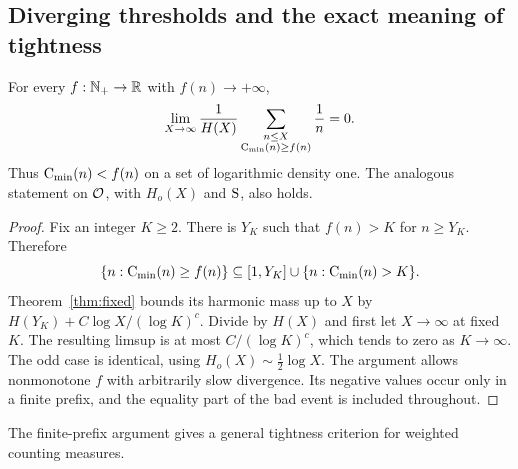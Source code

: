 \subsection{Diverging thresholds and the exact meaning of tightness}

\begin{corollary}\label{cor:tao}
For every $f:\mathbb N_+\to\mathbb R$ with $f(n)\to+\infty$,
\[
 \lim_{X\to\infty}\frac1{H(X)}
 \sum_{\substack{n\leq X\\\mathrm C_{\min}(n)\geq f(n)}}\frac1n=0.
\]
Thus $\mathrm C_{\min}(n)<f(n)$ on a set of logarithmic density one.
The analogous statement on $\mathcal O$, with $H_o(X)$ and $\mathrm S$, also holds.
\end{corollary}
\begin{proof}
Fix an integer $K\geq2$.  There is $Y_K$ such that $f(n)>K$ for
$n\geq Y_K$.  Therefore
\[
 \{n:\mathrm C_{\min}(n)\geq f(n)\}
 \subseteq[1,Y_K]\cup\{n:\mathrm C_{\min}(n)>K\}.
\]
Theorem~\ref{thm:fixed} bounds its harmonic mass up to $X$ by
$H(Y_K)+C\log X/(\log K)^c$.  Divide by $H(X)$ and first let
$X\to\infty$ at fixed $K$.  The resulting limsup is at most
$C/(\log K)^c$, which tends to zero as $K\to\infty$.
The odd case is identical, using $H_o(X)\sim\frac12\log X$.
The argument allows nonmonotone $f$ with arbitrarily slow divergence.
Its negative values occur only in a finite prefix, and the equality part
of the bad event is included throughout.
\end{proof}

The finite-prefix argument gives a general tightness criterion for
weighted counting measures.

